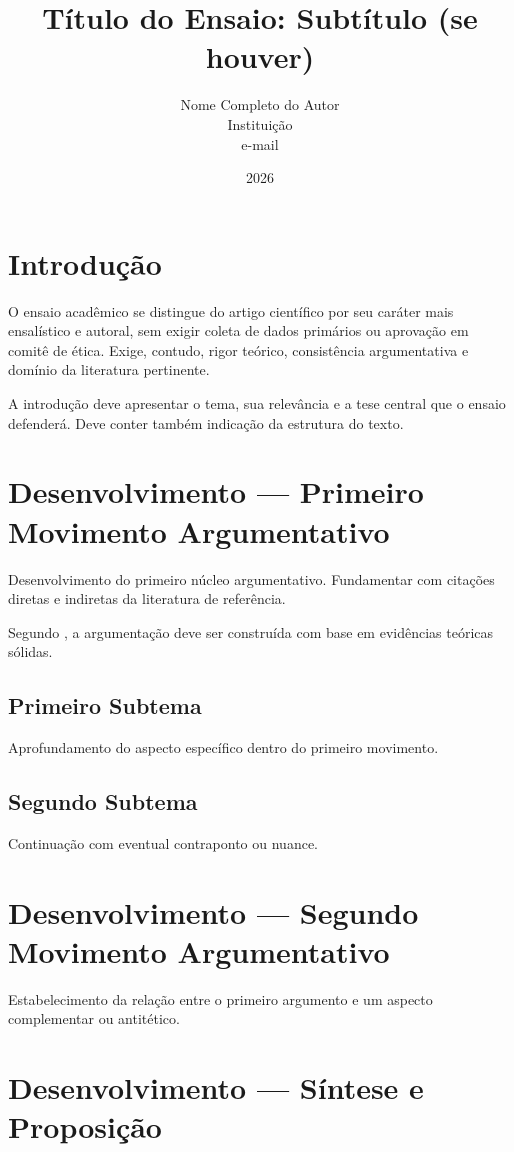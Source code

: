 \documentclass[
  12pt,
  a4paper,
  brazilian
]{article}
\title{Título do Ensaio: Subtítulo (se houver)}
\author{Nome Completo do Autor \\ \small{Instituição} \\ \small{e-mail}}
\date{2026}
\begin{document}
\maketitle

\section{Introdução}

O ensaio acadêmico se distingue do artigo científico por seu caráter mais
ensalístico e autoral, sem exigir coleta de dados primários ou aprovação
em comitê de ética. Exige, contudo, rigor teórico, consistência
argumentativa e domínio da literatura pertinente.

A introdução deve apresentar o tema, sua relevância e a tese central que o
ensaio defenderá. Deve conter também indicação da estrutura do texto.

\section{Desenvolvimento — Primeiro Movimento Argumentativo}

Desenvolvimento do primeiro núcleo argumentativo. Fundamentar com citações
diretas e indiretas da literatura de referência.

Segundo \cite{autor2021}, a argumentação deve ser construída com base em
evidências teóricas sólidas.

\subsection{Primeiro Subtema}

Aprofundamento do aspecto específico dentro do primeiro movimento.

\subsection{Segundo Subtema}

Continuação com eventual contraponto ou nuance.

\section{Desenvolvimento — Segundo Movimento Argumentativo}

Estabelecimento da relação entre o primeiro argumento e um aspecto
complementar ou antitético.

\section{Desenvolvimento — Síntese e Proposição}
\end{document}

